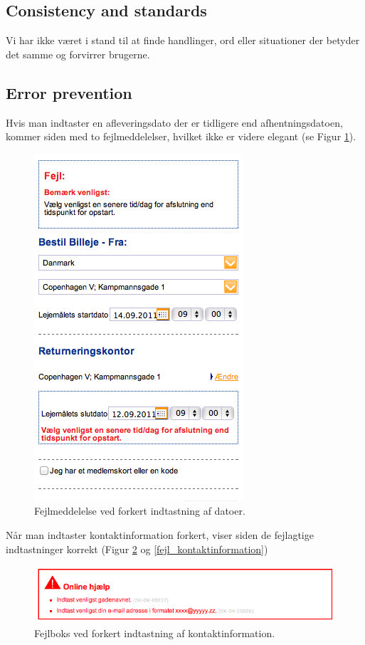 \documentclass[a4paper]{article}
\begin{document}
\subsection{Consistency and standards}
Vi har ikke været i stand til at finde handlinger, ord eller situationer der
betyder det samme og forvirrer brugerne.

\subsection{Error prevention}
Hvis man indtaster en afleveringsdato der er tidligere end afhentningsdatoen,
kommer siden med to fejlmeddelelser, hvilket ikke er videre elegant (se Figur
\ref{fejl_datoer}).

\begin{figure}[htbp]
  \begin{center}
    \includegraphics[scale=.6]{6.png}
  \end{center}
  \caption{Fejlmeddelelse ved forkert indtastning af datoer.}
  \label{fejl_datoer}
\end{figure}

Når man indtaster kontaktinformation forkert, viser siden de fejlagtige
indtastninger korrekt (Figur \ref{fejl_boks} og \ref{fejl_kontaktinformation})

\begin{figure}[htbp]
  \begin{center}
    \includegraphics[scale=.6]{10.png}
  \end{center}
  \caption{Fejlboks ved forkert indtastning af kontaktinformation.}
  \label{fejl_boks}
\end{figure}
\end{document}
